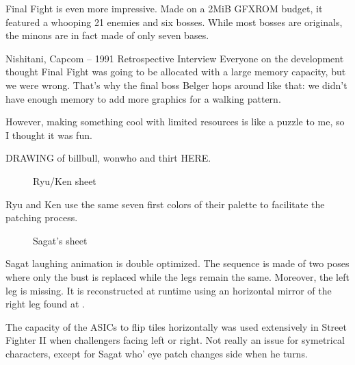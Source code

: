 Final Fight is even more impressive. Made on a 2MiB GFXROM budget, it featured a whooping 21 enemies and six bosses. While most bosses are originals, the minons are in fact made of only seven bases.



\begin{q}{Nishitani, Capcom – 1991 Retrospective Interview}
Everyone on the development thought Final Fight was going to be allocated with a large memory capacity, but we were wrong.
That’s why the final boss Belger hops around like that: we didn’t have enough memory to add more graphics for a walking pattern. 

However, making something cool with limited resources is like a puzzle to me, so I thought it was fun. 
\end{q}

DRAWING of billbull, wonwho and thirt HERE.

 \begin{figure}[H]
\caption*{Ryu/Ken sheet}
\end{figure}

Ryu and Ken use the same seven first colors of their palette to facilitate the patching process. 






 \begin{figure}[H]
\caption*{Sagat's sheet}
\end{figure}

Sagat laughing animation is double optimized. The sequence is made of two poses where only the bust is replaced while the legs remain the same. Moreover, the left leg is missing. It is reconstructed at runtime using an horizontal mirror of the right leg found at .

\begin{trivia}
The capacity of the ASICs to flip tiles horizontally was used extensively in Street Fighter II when challengers facing left or right. Not really an issue for symetrical characters, except for Sagat who' eye patch changes side when he turns.
\end{trivia}

